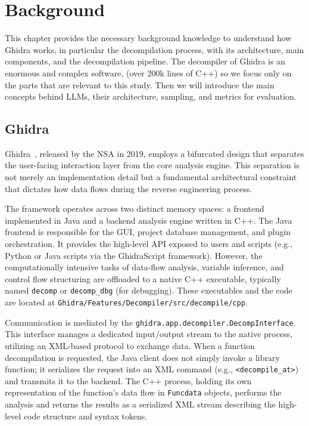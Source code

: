 \chapter{Background}\label{ch:background}

This chapter provides the necessary background knowledge to understand how Ghidra works, in particular the decompilation process,
with its architecture, main components, and the decompilation pipeline. The decompiler of Ghidra is an enormous and complex software, (over 200k lines of C++)
so we focus only on the parts that are relevant to this study.
Then we will introduce the main concepts behind \ac{LLM}s, their architecture, sampling, and metrics for evaluation.

\section{Ghidra}\label{sec:ghidra}

Ghidra~\cite{site:ghidra2019}, released by the \ac{NSA} in 2019, employs a bifurcated design
that separates the user-facing interaction layer from the core analysis engine. This separation is
not merely an implementation detail but a fundamental architectural constraint that dictates how data 
flows during the reverse engineering process.

The framework operates across two distinct memory spaces: a frontend implemented in Java and a backend
analysis engine written in C++. The Java frontend is responsible for the \ac{GUI},
project database management, and plugin orchestration. It provides the high-level API exposed to users
and scripts (e.g., Python or Java scripts via the GhidraScript framework). However, the computationally
intensive tasks of data-flow analysis, variable inference, and control flow structuring are offloaded to
a native C++ executable, typically named \texttt{decomp} or \texttt{decomp\_dbg} (for debugging).
These executables and the code are located at \texttt{Ghidra/Features/Decompiler/src/decompile/cpp}.

Communication is mediated by the \texttt{ghidra.app.decompiler.DecompInterface}. 
This interface manages a dedicated input/output stream to the native process, utilizing an XML-based protocol to exchange data.
When a function decompilation is requested, the Java client does not simply invoke a library function; it serializes the request into
an XML command (e.g., \texttt{<decompile\_at>}) and transmits it to the backend. The C++ process, holding its own representation
of the function's data flow in \texttt{Funcdata} objects, performs the analysis and returns the results as a serialized XML stream
describing the high-level code structure and syntax tokens.

